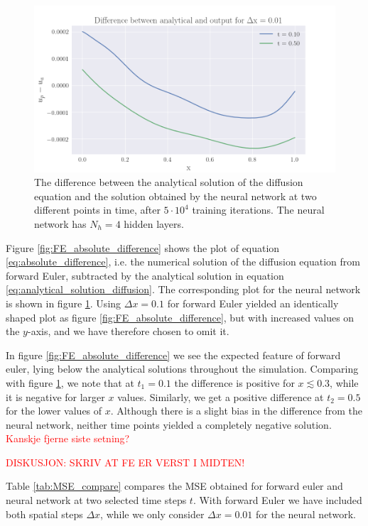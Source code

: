 \documentclass[12pt]{extarticle}
\begin{document}
\begin{figure}[h]
	\centering
	\includegraphics[width=0.8\linewidth]{../output/plots/final_compare_NN.png}
	\caption{The difference between the analytical solution of the diffusion equation and the solution obtained by the neural network at two different points in time, after $5\cdot10^4$ training iterations. The neural network has $N_h=4$ hidden layers.} \label{fig:NN_relative_error}
\end{figure}

Figure \ref{fig:FE_absolute_difference} shows the plot of equation \eqref{eq:absolute_difference}, i.e. the numerical solution of the diffusion equation from forward Euler, subtracted by the analytical solution in equation \eqref{eq:analytical_solution_diffusion}. The corresponding plot for the neural network is shown in figure \ref{fig:NN_relative_error}. Using $\Delta x=0.1$ for forward Euler yielded an identically shaped plot as figure \ref{fig:FE_absolute_difference}, but with increased values on the $y$-axis, and we have therefore chosen to omit it. 

In figure \ref{fig:FE_absolute_difference} we see the expected feature of forward euler, lying below the analytical solutions throughout the simulation. Comparing with figure \ref{fig:NN_relative_error}, we note that at $t_1=0.1$ the difference is positive for $x\lesssim0.3$, while it is negative for larger $x$ values. Similarly, we get a positive difference at $t_2=0.5$ for the lower values of $x$. Although there is a slight bias in the difference from the neural network, neither time points yielded a completely negative solution. \textcolor{red}{Kanskje fjerne siste setning?}   

\textcolor{red}{DISKUSJON: SKRIV AT FE ER VERST I MIDTEN!}



Table \ref{tab:MSE_compare} compares the MSE obtained for forward euler and neural network at two selected time steps $t$. With forward Euler we have included both spatial steps $\Delta x$, while we only consider $\Delta x=0.01$ for the neural network. 
\end{document}

